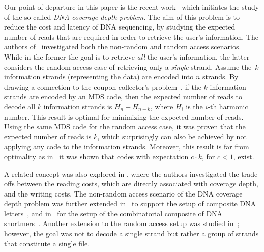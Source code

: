 \documentclass[11pt,a4paper,reqno,twoside]{amsart}
\theoremstyle{definition}
\begin{document}
Our point of departure in this paper is the recent work~\cite{bar2023cover} which initiates the study of the so-called \emph{DNA coverage depth problem}. The aim of this problem is to reduce the cost and latency of DNA sequencing, by studying the expected number of reads that are required in order to retrieve the user's information. The authors of~\cite{bar2023cover} investigated both the non-random and random access scenarios. While in the former the goal is to retrieve \emph{all} the user's information, the latter considers the random access case of retrieving only a \emph{single} strand. Assume the~$k$ information strands (representing the data) are encoded into $n$ strands. By drawing a connection to the coupon collector's problem~\cite{erdHos1961classical, felleb1968introduction, flajolet1992birthday, newman1960double}, if the $k$ information strands are encoded by an MDS code, then the expected number of reads to decode all $k$ information strands is $H_n-H_{n-k}$, where $H_i$ is the $i$-th harmonic number.
This result is optimal for minimizing the expected number of reads. Using the same MDS code for the random access case, it was proven that the expected number of reads is $k$, which surprisingly can also be achieved by not applying any code to the information strands. Moreover, this result is far from optimality as in~\cite{bar2023cover} it was shown that codes with expectation $c \cdot k$, for $c < 1$, exist. 


A related concept was also explored in \cite{chandak2019improved}, where the authors investigated the trade-offs between the reading costs, which are directly associated with coverage depth, and the writing costs. The non-random access scenario of the DNA coverage depth problem was further extended in~\cite{cohen2024optimizing} to support the setup of composite DNA letters~\cite{anavy2019data}, and in~\cite{preuss2024sequencing, sokolovskii2024coding} for the setup of the combinatorial composite of DNA shortmers~\cite{preuss2021efficient}.
Another extension to the random access setup was studied in~\cite{AGY24};  however, the goal was  not to decode a single strand but rather a group of strands that constitute a single file. 
\end{document}
